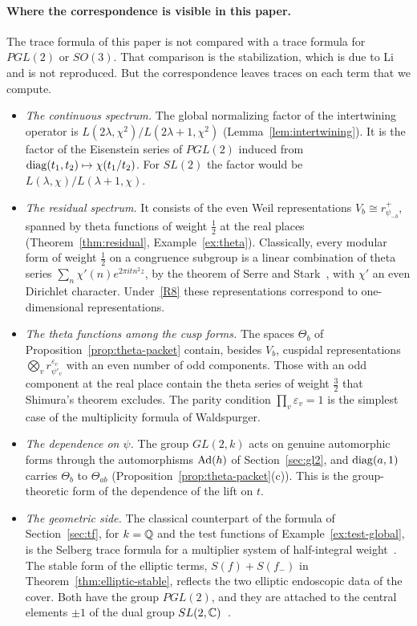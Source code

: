 \paragraph{Where the correspondence is visible in this paper.} The
trace formula of this paper is not compared with a trace formula for
$PGL(2)$ or $SO(3)$. That comparison is the stabilization, which is due
to Li~\cite{Li21} and is not reproduced. But the correspondence leaves
traces on each term that we compute.
\begin{itemize}
\item \emph{The continuous spectrum.} The global normalizing factor of
  the intertwining operator is $L(2\lambda,\chi^2)/L(2\lambda+1,\chi^2)$
  (Lemma~\ref{lem:intertwining}). It is the factor of the Eisenstein
  series of $PGL(2)$ induced from $\operatorname{diag}(t_1,t_2)\mapsto\chi(t_1/t_2)$.
  For $SL(2)$ the factor would be $L(\lambda,\chi)/L(\lambda+1,\chi)$.
\item \emph{The residual spectrum.} It consists of the even Weil
  representations $V_b\cong r^+_{\psi_{-b}}$, spanned by theta functions
  of weight $\frac12$ at the real places (Theorem~\ref{thm:residual},
  Example~\ref{ex:theta}). Classically, every modular form of weight
  $\frac12$ on a congruence subgroup is a linear combination of theta
  series $\sum_n\chi'(n)e^{2\pi itn^2z}$, by the theorem of Serre and
  Stark~\cite{SS77}, with $\chi'$ an even Dirichlet character.
  Under~\ref{R8} these representations correspond to one-dimensional
  representations.
\item \emph{The theta functions among the cusp forms.} The spaces
  $\Theta_b$ of Proposition~\ref{prop:theta-packet} contain, besides
  $V_b$, cuspidal representations $\bigotimes_vr^{\varepsilon_v}_{\psi'_v}$
  with an even number of odd components. Those with an odd component at
  the real place contain the theta series of weight $\frac32$ that
  Shimura's theorem excludes. The parity condition $\prod_v\varepsilon_v
  =1$ is the simplest case of the multiplicity formula of Waldspurger.
\item \emph{The dependence on $\psi$.} The group $GL(2,k)$ acts on
  genuine automorphic forms through the automorphisms $\operatorname{Ad}(h)$ of
  Section~\ref{sec:gl2}, and $\operatorname{diag}(a,1)$ carries $\Theta_b$ to
  $\Theta_{ab}$ (Proposition~\ref{prop:theta-packet}(c)). This is the
  group-theoretic form of the dependence of the lift on $t$.
\item \emph{The geometric side.} The classical counterpart of the
  formula of Section~\ref{sec:tf}, for $k=\mathbb{Q}$ and the test functions of
  Example~\ref{ex:test-global}, is the Selberg trace formula for a
  multiplier system of half-integral weight~\cite{He83}. The stable form
  of the elliptic terms, $S(f)+S(f_-)$ in
  Theorem~\ref{thm:elliptic-stable}, reflects the two elliptic endoscopic
  data of the cover. Both have the group $PGL(2)$, and they are attached
  to the central elements $\pm1$ of the dual group
  $SL(2,\mathbb{C})$~\cite{Li11}.
\end{itemize}

